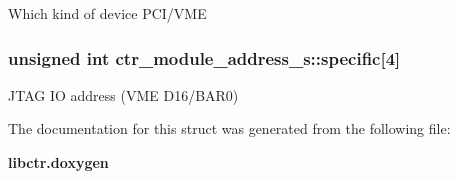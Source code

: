 Which kind of device PCI/VME 
\subsubsection{\setlength{\rightskip}{0pt plus 5cm}unsigned int \bf{ctr\_\-module\_\-address\_\-s::specific}[4]}\label{structctr__module__address__s_3b58bb68ce77338f4c08e1ea10cfa399}


JTAG IO address (VME D16/BAR0) 

The documentation for this struct was generated from the following file:\begin{CompactItemize}
\item 
\bf{libctr.doxygen}\end{CompactItemize}
